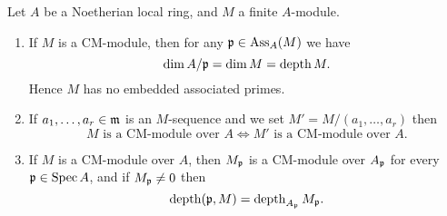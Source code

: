 \begin{theorem}
    Let $A$ be a Noetherian local ring, and $M$ a finite $A$-module.
    \begin{enumerate}[label=(\arabic*)]
        \item If $M$ is a CM-module, then for any $\mathfrak{p}\in\operatorname{Ass}_A(M)$ we have $$\dim A/\mathfrak{p} = \dim M = \operatorname{depth} M.$$
        Hence $M$ has no embedded associated primes.
        \item If $a_1,\dots,a_r\in\mathfrak{m}$ is an $M$-sequence and we set $M' = M/(a_1,\dots,a_r)$ then 
        \begin{equation*}
            M\text{ is a CM-module over }A\iff M'\text{ is a CM-module over }A.
        \end{equation*}
        \item If $M$ is a CM-module over $A$, then $M_{\mathfrak{p}}$ is a CM-module over $A_{\mathfrak{p}}$ for every $\mathfrak{p}\in\operatorname{Spec} A$, and if $M_{\mathfrak{p}}\ne 0$ then 
        \begin{equation*}
            \operatorname{depth}(\mathfrak{p}, M) = \operatorname{depth}_{A_{\mathfrak{p}}} M_{\mathfrak{p}}.
        \end{equation*}
    \end{enumerate}
\end{theorem}
